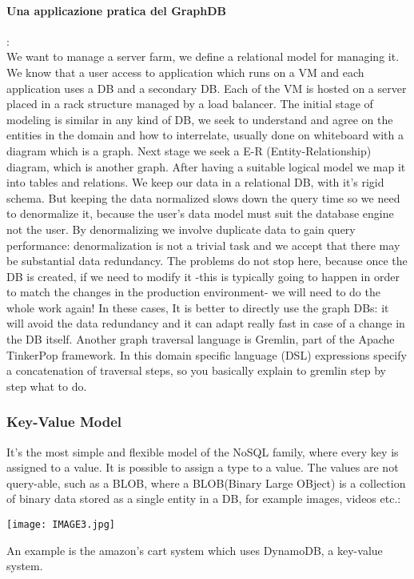 \documentclass[a4page, 11pt]{article}
\begin{document}
\paragraph{Una applicazione pratica del GraphDB}:\\ 
We want to manage a server farm, we define a relational model for managing it. 
We know that a user access to application which runs on a VM and each application uses a DB and a secondary DB. 
Each of the VM is hosted on a server placed in a rack structure managed by a load balancer.
\newline
The initial stage of modeling is similar in any kind of DB, we seek to understand and agree on the entities in the domain and how to interrelate, usually done on whiteboard with a diagram which is a graph.
Next stage we seek a E-R (Entity-Relationship) diagram, which is another graph. 
After having a suitable logical model we map it into tables and relations. 
We keep our data in a relational DB, with it's rigid schema.
But keeping the data normalized slows down the query time so we need to denormalize it, because the user's data model must suit the database engine not the user. 
By denormalizing we involve duplicate data to gain query performance: denormalization is not a trivial task and we accept that there may be substantial data redundancy. 
The problems do not stop here, because once the DB is created, if we need to modify it -this is typically going to happen in order to match the changes in the production environment- we will need to do the whole work again!
\newline
In these cases, It is better to directly use the graph DBs: it will avoid the data redundancy and it can adapt really fast in case of a change in the DB itself.
\newline
Another graph traversal language is Gremlin, part of the Apache TinkerPop framework. In this domain specific language (DSL) expressions specify a concatenation of traversal steps, so you basically explain to gremlin step by step what to do.

\subsubsection{Key-Value Model}

It's the most simple and flexible model of the NoSQL family, where every key is assigned to a value. It is possible to assign a type to a value.
The values are not query-able, such as a BLOB, where a BLOB(Binary Large OBject) is a collection of binary data stored as a single entity in a DB, for example images, videos etc.:
\begin{center}
\texttt{[image: IMAGE3.jpg]}
\end{center}
An example is the amazon's cart system which uses DynamoDB, a key-value system.
\end{document}
